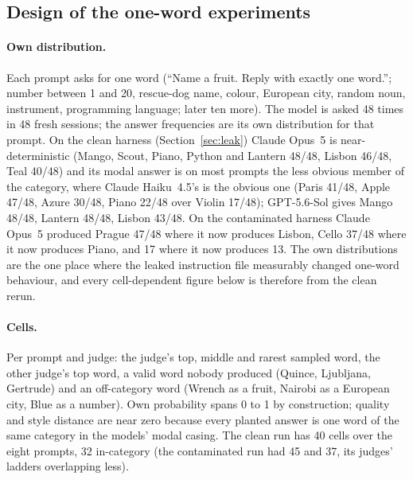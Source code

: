 \documentclass[twocolumn,10pt]{article}
\newcommand{\opus}{Claude Opus~5}
\newcommand{\haiku}{Claude Haiku~4.5}
\newcommand{\gpt}{GPT-5.6-Sol}
\begin{document}
\subsection{Design of the one-word experiments}
\label{sec:design}

\paragraph{Own distribution.} Each prompt asks for one word (``Name a fruit. Reply with exactly one word.''; number between 1 and 20, rescue-dog name, colour, European city, random noun, instrument, programming language; later ten more). The model is asked 48 times in 48 fresh sessions; the answer frequencies are its own distribution for that prompt. On the clean harness (Section~\ref{sec:leak}) \opus{} is near-deterministic (Mango, Scout, Piano, Python and Lantern 48/48, Lisbon 46/48, Teal 40/48) and its modal answer is on most prompts the less obvious member of the category, where \haiku{}'s is the obvious one (Paris 41/48, Apple 47/48, Azure 30/48, Piano 22/48 over Violin 17/48); \gpt{} gives Mango 48/48, Lantern 48/48, Lisbon 43/48. On the contaminated harness \opus{} produced Prague 47/48 where it now produces Lisbon, Cello 37/48 where it now produces Piano, and 17 where it now produces 13. The own distributions are the one place where the leaked instruction file measurably changed one-word behaviour, and every cell-dependent figure below is therefore from the clean rerun.

\paragraph{Cells.} Per prompt and judge: the judge's top, middle and rarest sampled word, the other judge's top word, a valid word nobody produced (Quince, Ljubljana, Gertrude) and an off-category word (Wrench as a fruit, Nairobi as a European city, Blue as a number). Own probability spans 0 to 1 by construction; quality and style distance are near zero because every planted answer is one word of the same category in the models' modal casing. The clean run has 40 cells over the eight prompts, 32 in-category (the contaminated run had 45 and 37, its judges' ladders overlapping less).
\end{document}

